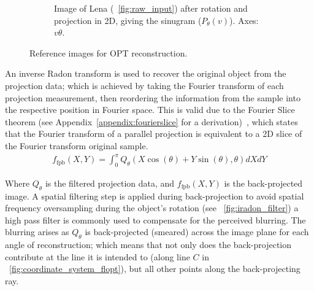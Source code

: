 \begin{figure}
\begin{subfigure}[t]{0.3\textwidth}
    \caption{Image of Lena (\figurename~\ref{fig:raw_input}) after rotation and projection in 2D, giving the sinugram (\(P_{\theta}(v)\)). Axes: \(v\theta\).
    }\label{fig:sinugram_stretch}
  \end{subfigure}\hfill
  \caption{Reference images for OPT reconstruction.}\label{fig:rawinputs}
\end{figure}


An inverse \gls{Radon transform} is used to recover the original object from the projection data; which is achieved by taking the \gls{Fourier transform} of each projection measurement, then reordering the information from the sample into the respective position in Fourier space.
This is valid due to the Fourier Slice theorem (see Appendix~\ref{appendix:fourierslice} for a derivation)~\cite{bracewellStripIntegrationRadio1956}, which states that the \gls{Fourier transform} of a parallel projection is equivalent to a 2D slice of the Fourier transform original sample.
\begin{align}
f_{\text{fpb}}(X,Y) = \int_{0}^{\pi} Q_\theta (X\cos(\theta)+Y\sin(\theta),\theta)dXdY
\end{align}

Where \(Q_\theta\) is the filtered projection data, and \(f_{\text{fpb}}(X,Y)\) is the back-projected image.
A spatial filtering step is applied during back-projection to avoid spatial frequency oversampling during the object’s rotation (see \figurename~\ref{fig:iradon_filter})
a high pass filter is commonly used to compensate for the perceived blurring.
The blurring arises as \(Q_\theta \) is back-projected (smeared) across the \gls{image plane} for each angle of reconstruction; which means that not only does the back-projection contribute at the line it is intended to (along line \(C\) in \figurename~\ref{fig:coordinate_system_flopt}), but all other points along the back-projecting ray.

